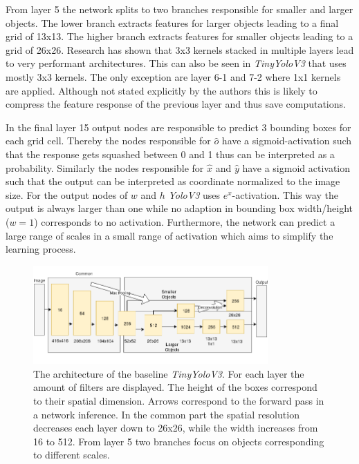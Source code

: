 	From layer 5 the network splits to two branches responsible for smaller and larger objects. The lower branch extracts features for larger objects leading to a final grid of 13x13. The higher branch extracts features for smaller objects leading to a grid of 26x26. Research has shown  that 3x3 kernels stacked in multiple layers lead to very performant architectures. This can also be seen in \textit{TinyYoloV3} that uses mostly 3x3 kernels. The only exception are layer 6-1 and 7-2 where 1x1 kernels are applied. Although not stated explicitly by the authors this is likely to compress the feature response of the previous layer and thus save computations.
	
	In the final layer 15 output nodes are responsible to predict 3 bounding boxes for each grid cell. Thereby the nodes responsible for $\hat o$ have a sigmoid-activation such that the response gets squashed between 0 and 1 thus can be interpreted as a probability. Similarly the nodes responsible for $\hat x$ and $\hat y$ have a sigmoid activation such that the output can be interpreted as coordinate normalized to the image size. For the output nodes of $w$ and $h$ \textit{YoloV3} uses $e^x$-activation. This way the output is always larger than one while no adaption in bounding box width/height ($w=1$) corresponds to no activation. Furthermore, the network can predict a large range of scales in a small range of activation which aims to simplify the learning process.
	
			
	\begin{figure}[hbtp]
		\centering
		\includegraphics[width=0.8\textwidth]{fig/tinyyolov3_arch}
		\caption{The architecture of the baseline \textit{TinyYoloV3}. For each layer the amount of filters are displayed. The height of the boxes correspond to their spatial dimension. Arrows correspond to the forward pass in a network inference. In the common part the spatial resolution decreases each layer down to 26x26, while the width increases from 16 to 512. From layer 5 two branches focus on objects corresponding to different scales. }
		\label{fig:tinyyolov3_arch}
	\end{figure}
	

